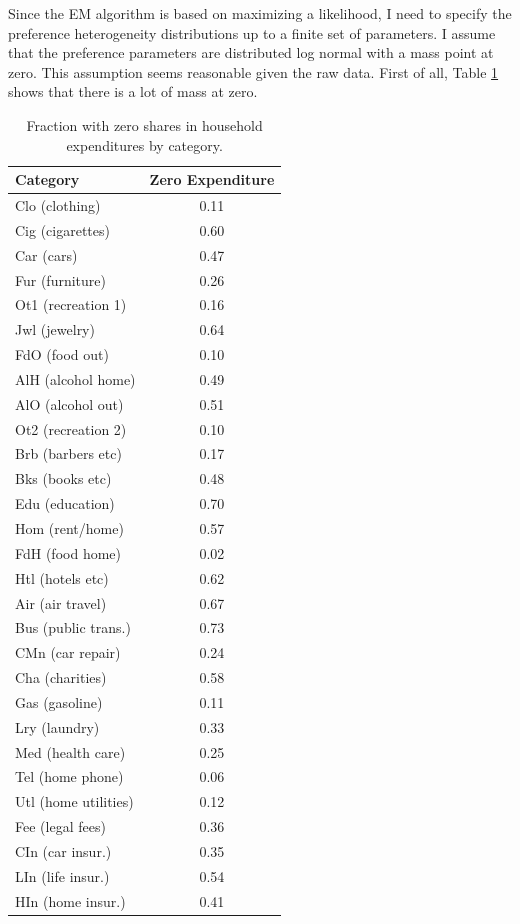 \documentclass{article}
\begin{document}
Since the EM algorithm is based on maximizing a likelihood, I need to specify the preference heterogeneity distributions up to a finite set of parameters.
I assume that the preference parameters are distributed log normal with a mass point at zero.
This assumption seems reasonable given the raw data.
First of all, Table \ref{tab:sharetab} shows that there is a lot of mass at zero.
\begin{table}
	\begin{center}
\begin{tabular}{|l|c|}
	\hline
\textbf{Category} & \textbf{Zero Expenditure} \\
	\hline
Clo (clothing) & 0.11 \\ 
	\hline
Cig (cigarettes) & 0.60 \\ 
	\hline
Car (cars) & 0.47 \\ 
	\hline
Fur (furniture) & 0.26 \\ 
	\hline
Ot1 (recreation 1) & 0.16 \\ 
	\hline
Jwl (jewelry) & 0.64 \\ 
	\hline
FdO (food out) & 0.10 \\ 
	\hline
AlH (alcohol home) & 0.49 \\ 
	\hline
AlO (alcohol out) & 0.51 \\ 
	\hline
Ot2 (recreation 2) & 0.10 \\ 
	\hline
Brb (barbers etc) & 0.17 \\ 
	\hline
Bks (books etc) & 0.48 \\ 
	\hline
Edu (education) & 0.70 \\ 
	\hline
Hom (rent/home) & 0.57 \\ 
	\hline
FdH (food home) & 0.02 \\ 
	\hline
Htl (hotels etc) & 0.62 \\ 
	\hline
Air (air travel) & 0.67 \\ 
	\hline
Bus (public trans.) & 0.73 \\ 
	\hline
CMn (car repair) & 0.24 \\ 
	\hline
Cha (charities) & 0.58 \\ 
	\hline
Gas (gasoline) & 0.11 \\ 
	\hline
Lry (laundry) & 0.33 \\ 
	\hline
Med (health care) & 0.25 \\ 
	\hline
Tel (home phone) & 0.06 \\ 
	\hline
Utl (home utilities) & 0.12 \\ 
	\hline
Fee (legal fees) & 0.36 \\ 
	\hline
CIn (car insur.) & 0.35 \\ 
	\hline
LIn (life insur.) & 0.54 \\ 
	\hline
HIn (home insur.) & 0.41 \\ 
	\hline
\end{tabular}
\end{center}
\label{tab:sharetab}
\caption{Fraction with zero shares in household expenditures by category.}
\vspace{-2in}
\end{table}
\end{document}
